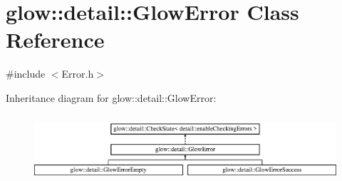 \hypertarget{classglow_1_1detail_1_1_glow_error}{}\section{glow\+:\+:detail\+:\+:Glow\+Error Class Reference}
\label{classglow_1_1detail_1_1_glow_error}


{\ttfamily \#include $<$Error.\+h$>$}

Inheritance diagram for glow\+:\+:detail\+:\+:Glow\+Error\+:\begin{figure}[H]
\begin{center}
\leavevmode
\includegraphics[height=2.477876cm]{classglow_1_1detail_1_1_glow_error}
\end{center}
\end{figure}
